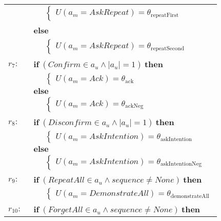 \begin{small}
\begin{longtable}{p{1cm}l}
& $\;\;\;\;\; \begin{cases}U(\mathit{a_m}\!=\!\mathit{AskRepeat})\!=\!\theta_{\mathrm{repeatFirst}}\end{cases}$ \\ & \textbf{else} \\
& $\;\;\;\;\; \begin{cases}U(\mathit{a_m}\!=\!\mathit{AskRepeat})\!=\!\theta_{\mathrm{repeatSecond}}\end{cases}$ \\ \\[-2mm]
$r_{7}: \ \ $& $\textbf{if} \ (\mathit{Confirm}\!\in\!\mathit{a_u} \land \mathit{|a_u|}\!=\!\mathit{1}) \ \textbf{then}$ \\
& $\;\;\;\;\; \begin{cases}U(\mathit{a_m}\!=\!\mathit{Ack})\!=\!\theta_{\mathrm{ack}}\end{cases}$ \\ 
& $\textbf{else}$ \\
& $\;\;\;\;\; \begin{cases}U(\mathit{a_m}\!=\!\mathit{Ack})\!=\!\theta_{\mathrm{ackNeg}}\end{cases}$ \\ \\[-2mm]
$r_{8}: \ \ $& $\textbf{if} \ (\mathit{Disconfirm}\!\in\!\mathit{a_u} \land \mathit{|a_u|}\!=\!\mathit{1}) \ \textbf{then}$ \\
& $\;\;\;\;\; \begin{cases}U(\mathit{a_m}\!=\!\mathit{AskIntention})\!=\!\theta_{\mathrm{askIntention}}\end{cases}$ \\ 
& $\textbf{else}$ \\
& $\;\;\;\;\; \begin{cases}U(\mathit{a_m}\!=\!\mathit{AskIntention})\!=\!\theta_{\mathrm{askIntentionNeg}}\end{cases}$\\ \\[-2mm]
$r_{9}: \ \ $& $\textbf{if} \ (\mathit{RepeatAll}\!\in\!\mathit{a_u} \land \mathit{sequence}\!\neq\!\mathit{None}) \ \textbf{then}$ \\
& $\;\;\;\;\; \begin{cases}U(\mathit{a_m}\!=\!\mathit{DemonstrateAll})\!=\!\theta_{\mathrm{demonstrateAll}}\end{cases}$\\ \\[-2mm]
$r_{10}: \ \ $& $\textbf{if} \ (\mathit{ForgetAll}\!\in\!\mathit{a_u} \land \mathit{sequence}\!\neq\!\mathit{None}) \ \textbf{then}$ \\

\end{longtable}
\end{small}
